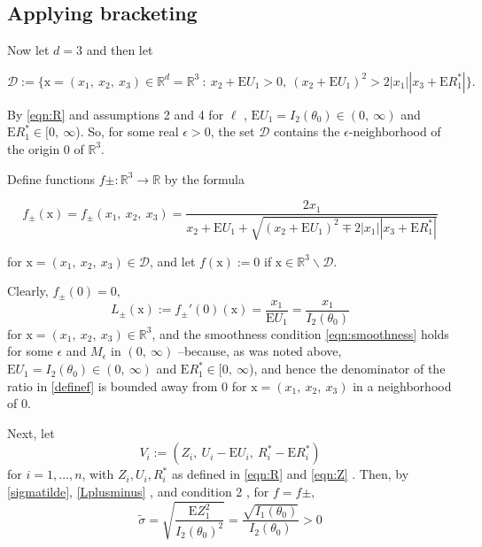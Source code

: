 \subsection*{Applying bracketing}

Now let $d=3$ and then let

$$\mathcal{D} :=\{\mathrm{x}=(x_{1},\ x_{2},\ x_{3})\in \mathbb{R}^{d}=\mathbb{R}^{3}\ :\ x_{2}+\mathrm{E}U_{1}>0,\ (x_{2}+\mathrm{E}U_{1})^{2}>2|x_{1}||x_{3}+\mathrm{E}R_{1}^{*}|\}.$$

By \eqref{eqn:R} and assumptions 2 and 4 for $\ell$ , $\mathrm{E}U_{1}=I_2(\theta_{0})\in(0,\ \infty)$ and $\mathrm{E}R_{1}^{*}\in[0,\ \infty$). So, for some real $\epsilon>0$, the set $\mathcal{D}$ contains the $\epsilon$-neighborhood of the origin $0$ of $\mathbb{R}^{3}.$

Define functions $f\pm:\mathbb{R}^{3}\rightarrow \mathbb{R}$ by the formula

\begin{equation}\label{definef}
f_{\pm}(\displaystyle \mathrm{x})=f_{\pm}(x_{1},\ x_{2},\ x_{3})=\frac{2x_{1}}{x_{2}+\mathrm{E}U_{1}+\sqrt{(x_{2}+\mathrm{E}U_{1})^{2}\mp 2|x_{1}||x_{3}+\mathrm{E}R_{1}^{*}|}}
\end{equation}

for $\mathrm{x}=(x_{1},\ x_{2},\ x_{3})\in \mathcal{D}$, and let $f(\mathrm{x}) :=0$ if $\mathrm{x}\in \mathbb{R}^{3}\backslash \mathcal{D}$. 

Clearly, $f_{\pm}(0)=0,$
\begin{equation}\label{Lplusminus}
	L_{\pm}(\displaystyle \mathrm{x}):=f_{\pm}'(0)(\mathrm{x})=\frac{x_{1}}{\mathrm{E}U_{1}}=\frac{x_{1}}{I_2(\theta_{0})}
\end{equation}
for $\mathrm{x}=(x_{1},\ x_{2},\ x_{3})\in \mathbb{R}^{3}$, and the smoothness condition \eqref{eqn:smoothness} holds for some $\epsilon$ and $M_{\epsilon}$ in $(0,\ \infty)$ --because, as was noted above, $\mathrm{E}U_{1}=I_2(\theta_{0})\in(0,\ \infty)$ and $\mathrm{E}R_{1}^{*}\in[0,\ \infty$), and hence the denominator of the ratio in \eqref{definef} is bounded away from $0$ for $\mathrm{x}=(x_{1},\ x_{2},\ x_{3})$ in a neighborhood of $0.$

Next, let
\begin{equation}\label{Vi}
	V_{i}:=(Z_{i},\ U_{i}-\mathrm{E}U_{i},\ R_{i}^{*}-\mathrm{E}R_{i}^{*})
\end{equation}
for $i=1,\ldots,n$, with $Z_{i}, U_{i}, R_{i}^{*}$ as defined in \eqref{eqn:R} and \eqref{eqn:Z} . Then, by \eqref{sigmatilde}, \eqref{Lplusminus} , and condition 2 , for $f=f\pm,$
\begin{equation}\label{sigmatilde1}
	\tilde{\sigma} = \sqrt{\frac{\mathrm{E}Z_{1}^{2}}{I_2(\theta_{0})^{2}}}=\frac{\sqrt{I_1(\theta_0)}}{I_2(\theta_{0})}>0
\end{equation}

